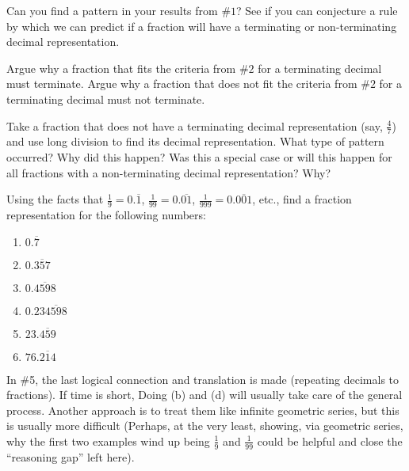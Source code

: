 \documentclass{ximera}
\begin{document}
\begin{problem}
Can you find a pattern in your results from $\#1$? See if you can
conjecture a rule by which we can predict if a fraction will have a
terminating or non-terminating decimal representation.

\end{problem}


\begin{problem}
Argue why a fraction that fits the criteria from $\#2$ for a
terminating decimal must terminate. Argue why a fraction that does not
fit the criteria from $\#2$ for a terminating decimal must not
terminate.
\end{problem}


\begin{problem}
Take a fraction that does not have a terminating decimal
representation (say, $\frac{4}{7}$) and use long division to find its
decimal representation.  What type of pattern occurred?  Why did this
happen?  Was this a special case or will this happen for all fractions
with a non-terminating decimal representation?  Why?

\end{problem}

\begin{problem}
Using the facts that $\frac{1}{9}=0.\overline{1}$,
$\frac{1}{99}=0.\overline{01}$, $\frac{1}{999}=0.\overline{001}$,
etc., find a fraction representation for the following numbers:

\begin{enumerate}
\item $0.\overline{7}$
\item $0.\overline{357}$
\item $0.\overline{4598}$
\item $0.23\overline{4598}$
\item $23.\overline{459}$
\item $76.\overline{214}$
\end{enumerate}

\begin{instructorNotes}
In \#5, the last logical connection and translation is made (repeating decimals to fractions).  If time is short, Doing (b) and (d) will usually take care of the general process.  Another approach is to treat them like infinite geometric series, but this is usually more difficult (Perhaps, at the very least, showing, via geometric series, why the first two examples wind up being $\frac19$ and $\frac{1}{99}$ could be helpful and close the ``reasoning gap'' left here).
\end{instructorNotes}
\end{problem}
\end{document}
